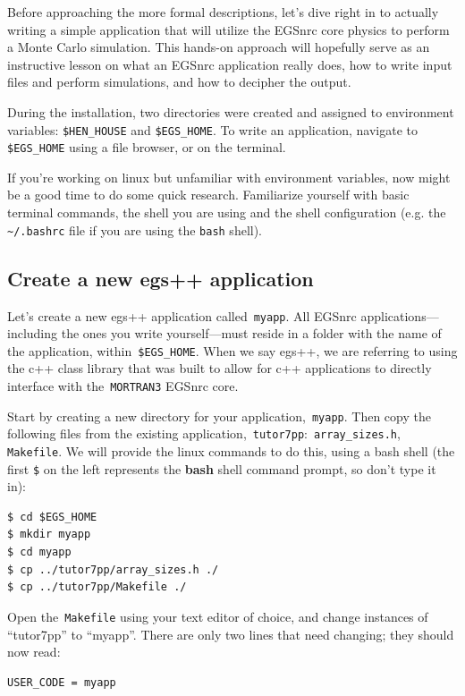 \documentclass[12pt,twoside]{article}
\begin{document}
Before approaching the more formal descriptions, let's dive right in to actually writing a simple application that will utilize the EGSnrc core physics to perform a Monte Carlo simulation. This hands-on approach will hopefully serve as an instructive lesson on what an EGSnrc application really does, how to write input files and perform simulations, and how to decipher the output.

During the installation, two directories were created and assigned to environment variables: \Verb+$HEN_HOUSE+ and \Verb+$EGS_HOME+. To write an application, navigate to \Verb+$EGS_HOME+ using a file browser, or on the terminal.

If you're working on linux but unfamiliar with environment variables, now might be a good time to do some quick research. Familiarize yourself with basic terminal commands, the shell you are using and the shell configuration (e.g. the \Verb+~/.bashrc+ file if you are using the \Verb+bash+ shell).

\subsection{Create a new egs++ application}

Let's create a new egs++ application called \,\Verb|myapp|. All EGSnrc
applications---including the ones you write yourself---must reside in a
folder with the name of the application, within \,\Verb|$EGS_HOME|.
When we say egs++, we are referring to using the c++ class library that was
built to allow for c++ applications to directly interface with
the \,\Verb|MORTRAN3| EGSnrc core.

Start by creating a new directory for your application, \,\Verb|myapp|.
Then copy the following files from the existing application, \,\Verb|tutor7pp|: \,\Verb|array_sizes.h|, \,\Verb|Makefile|.
We will provide the linux commands to do this, using a bash shell
(the first \Verb|$| on the left represents the \textbf{bash} shell command prompt,
so don't type it in):

\begin{lstlisting}
$ cd $EGS_HOME
$ mkdir myapp
$ cd myapp
$ cp ../tutor7pp/array_sizes.h ./
$ cp ../tutor7pp/Makefile ./
\end{lstlisting}

Open the \,\Verb|Makefile| using your text editor of choice, and change
instances of ``tutor7pp'' to ``myapp''. There are only two lines that need
changing; they should now read:

\begin{lstlisting}
USER_CODE = myapp
\end{lstlisting}
\end{document}
